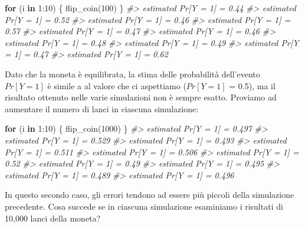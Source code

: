 \documentclass[
  11pt,
]{krantz}
\makeatletter
\newenvironment{Shaded}{\begin{snugshade}}{\end{snugshade}}
\newcommand{\CommentTok}[1]{\textcolor[rgb]{0.37,0.37,0.37}{\textit{#1}}}
\newcommand{\ControlFlowTok}[1]{\textcolor[rgb]{0.27,0.27,0.27}{\textbf{#1}}}
\newcommand{\DecValTok}[1]{\textcolor[rgb]{0.06,0.06,0.06}{#1}}
\newcommand{\FunctionTok}[1]{\textcolor[rgb]{0,0,0}{#1}}
\newcommand{\NormalTok}[1]{#1}
\newcommand{\SpecialCharTok}[1]{\textcolor[rgb]{0,0,0}{#1}}
\newenvironment{kframe}{%
\medskip{}
\setlength{\fboxsep}{.8em}
 \def\at@end@of@kframe{}%
 \ifinner\ifhmode%
  \def\at@end@of@kframe{\end{minipage}}%
  \begin{minipage}{\columnwidth}%
 \fi\fi%
 \def\FrameCommand##1{\hskip\@totalleftmargin \hskip-\fboxsep
 \colorbox{shadecolor}{##1}\hskip-\fboxsep
     \hskip-\linewidth \hskip-\@totalleftmargin \hskip\columnwidth}%
 \MakeFramed {\advance\hsize-\width
   \@totalleftmargin\z@ \linewidth\hsize
   \@setminipage}}%
 {\par\unskip\endMakeFramed%
 \at@end@of@kframe}
\renewenvironment{Shaded}{\begin{kframe}}{\end{kframe}}
\theoremstyle{definition}
\theoremstyle{definition}
\theoremstyle{definition}
\theoremstyle{definition}
\theoremstyle{remark}
\makeatother
\begin{document}
\begin{Shaded}
\begin{Highlighting}[]
\ControlFlowTok{for}\NormalTok{ (i }\ControlFlowTok{in} \DecValTok{1}\SpecialCharTok{:}\DecValTok{10}\NormalTok{) \{}
  \FunctionTok{flip\_coin}\NormalTok{(}\DecValTok{100}\NormalTok{)}
\NormalTok{\}}
\CommentTok{\#\textgreater{} estimated Pr[Y = 1] = 0.44 }
\CommentTok{\#\textgreater{} estimated Pr[Y = 1] = 0.52 }
\CommentTok{\#\textgreater{} estimated Pr[Y = 1] = 0.46 }
\CommentTok{\#\textgreater{} estimated Pr[Y = 1] = 0.57 }
\CommentTok{\#\textgreater{} estimated Pr[Y = 1] = 0.47 }
\CommentTok{\#\textgreater{} estimated Pr[Y = 1] = 0.46 }
\CommentTok{\#\textgreater{} estimated Pr[Y = 1] = 0.48 }
\CommentTok{\#\textgreater{} estimated Pr[Y = 1] = 0.49 }
\CommentTok{\#\textgreater{} estimated Pr[Y = 1] = 0.47 }
\CommentTok{\#\textgreater{} estimated Pr[Y = 1] = 0.62}
\end{Highlighting}
\end{Shaded}

Dato che la moneta è equilibrata, la stima delle probabilità dell'evento \(Pr[Y = 1]\) è simile a al valore che ci aspettiamo (\(Pr[Y = 1]\) = 0.5), ma il risultato ottenuto nelle varie simulazioni non è sempre esatto. Proviamo ad aumentare il numero di lanci in ciascuna simulazione:

\begin{Shaded}
\begin{Highlighting}[]
\ControlFlowTok{for}\NormalTok{ (i }\ControlFlowTok{in} \DecValTok{1}\SpecialCharTok{:}\DecValTok{10}\NormalTok{) \{}
  \FunctionTok{flip\_coin}\NormalTok{(}\DecValTok{1000}\NormalTok{)}
\NormalTok{\}}
\CommentTok{\#\textgreater{} estimated Pr[Y = 1] = 0.497 }
\CommentTok{\#\textgreater{} estimated Pr[Y = 1] = 0.529 }
\CommentTok{\#\textgreater{} estimated Pr[Y = 1] = 0.493 }
\CommentTok{\#\textgreater{} estimated Pr[Y = 1] = 0.511 }
\CommentTok{\#\textgreater{} estimated Pr[Y = 1] = 0.506 }
\CommentTok{\#\textgreater{} estimated Pr[Y = 1] = 0.52 }
\CommentTok{\#\textgreater{} estimated Pr[Y = 1] = 0.49 }
\CommentTok{\#\textgreater{} estimated Pr[Y = 1] = 0.495 }
\CommentTok{\#\textgreater{} estimated Pr[Y = 1] = 0.489 }
\CommentTok{\#\textgreater{} estimated Pr[Y = 1] = 0.496}
\end{Highlighting}
\end{Shaded}

In questo secondo caso, gli errori tendono ad essere più piccoli della simulazione precedente. Cosa succede se in ciascuna simulazione esaminiamo i risultati di 10,000 lanci della moneta?
\end{document}
